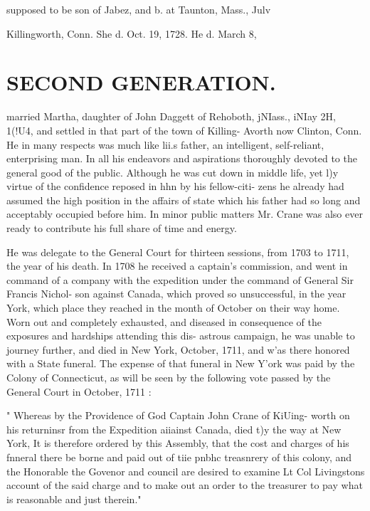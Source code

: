 \documentclass[oneside]{book}
\begin{document}
supposed to be son of Jabez, and b. at Taunton, Mass., Julv 


Killingworth, Conn. She d. Oct. 19, 1728. He d. March 8, 




\section{SECOND GENERATION.}


married Martha, daughter of John Daggett of Rehoboth, jNIass., 
iNIay 2H, 1(!U4, and settled in that part of the town of Killing- 
Avorth now Clinton, Conn. He in many respects was much like 
lii.s father, an intelligent, self-reliant, enterprising man. In all 
his endeavors and aspirations thoroughly devoted to the general 
good of the public. Although he was cut down in middle life, 
yet l)y virtue of the confidence reposed in hhn by his fellow-citi- 
zens he already had assumed the high position in the affairs of 
state which his father had so long and acceptably occupied before 
him. In minor public matters Mr. Crane was also ever ready to 
contribute his full share of time and energy. 

He was delegate to the General Court for thirteen sessions, 
from 1703 to 1711, the year of his death. In 1708 he received a 
captain's commission, and went in command of a company with 
the expedition under the command of General Sir Francis Nichol- 
son against Canada, which proved so unsuccessful, in the year 
York, which place they reached in the month of October on their 
way home. Worn out and completely exhausted, and diseased 
in consequence of the exposures and hardships attending this dis- 
astrous campaign, he was unable to journey further, and died in 
New York, October, 1711, and w'as there honored with a State 
funeral. The expense of that funeral in New Y'ork was paid by 
the Colony of Connecticut, as will be seen by the following vote 
passed by the General Court in October, 1711 : 

" Whereas by the Providence of God Captain John Crane of KiUing- 
worth on his returninsr from the Expedition aiiainst Canada, died t)y the 
way at New York, It is therefore ordered by this Assembly, that the 
cost and charges of his fnneral there be borne and paid out of tiie pnbhc 
treasnrery of this colony, and the Honorable the Govenor and council 
are desired to examine Lt Col Livingstons account of the said charge 
and to make out an order to the treasurer to pay what is reasonable and 
just therein." 
\end{document}
